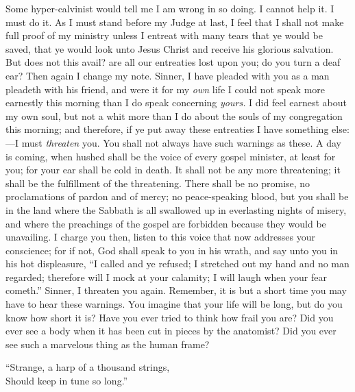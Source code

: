 \documentclass[
]{book}
\begin{document}
Some hyper-calvinist would tell me I am wrong in so doing. I cannot help it. I must do it. As I must stand before my Judge at last, I feel that I shall not make full proof of my ministry unless I entreat with many tears that ye would be saved, that ye would look unto Jesus Christ and receive his glorious salvation. But does not this avail? are all our entreaties lost upon you; do you turn a deaf ear? Then again I change my note. Sinner, I have pleaded with you as a man pleadeth with his friend, and were it for my \emph{own} life I could not speak more earnestly this morning than I do speak concerning \emph{yours.} I did feel earnest about my own soul, but not a whit more than I do about the souls of my congregation this morning; and therefore, if ye put away these entreaties I have something else: ---I must \emph{threaten} you. You shall not always have such warnings as these. A day is coming, when hushed shall be the voice of every gospel minister, at least for you; for your ear shall be cold in death. It shall not be any more threatening; it shall be the fulfillment of the threatening. There shall be no promise, no proclamations of pardon and of mercy; no peace-speaking blood, but you shall be in the land where the Sabbath is all swallowed up in everlasting nights of misery, and where the preachings of the gospel are forbidden because they would be unavailing. I charge you then, listen to this voice that now addresses your conscience; for if not, God shall speak to you in his wrath, and say unto you in his hot displeasure, ``I called and ye refused; I stretched out my hand and no man regarded; therefore will I mock at your calamity; I will laugh when your fear cometh.'' Sinner, I threaten you again. Remember, it is but a short time you may have to hear these warnings. You imagine that your life will be long, but do you know how short it is? Have you ever tried to think how frail you are? Did you ever see a body when it has been cut in pieces by the anatomist? Did you ever see such a marvelous thing as the human frame?

``Strange, a harp of a thousand strings,\\
Should keep in tune so long.''
\end{document}
